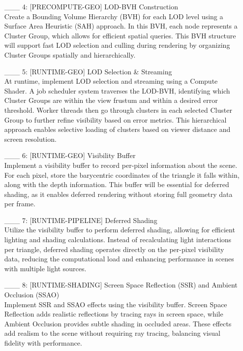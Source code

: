 \documentclass {article}
\begin{document}
\begin{enumerate}
     \item[\_\_\_ 4:]  [PRECOMPUTE-GEO] LOD-BVH Construction
     \\ Create a Bounding Volume Hierarchy (BVH) for each LOD level using a Surface Area Heuristic (SAH) approach. In this 
     BVH, each node represents a Cluster Group, which allows for efficient spatial queries. This BVH structure will support 
     fast LOD selection and culling during rendering by organizing Cluster Groups spatially and hierarchically.
 
     \item[\_\_\_ 5:]  [RUNTIME-GEO] LOD Selection \& Streaming
     \\ At runtime, implement LOD selection and streaming using a Compute Shader. A job scheduler system traverses the 
     LOD-BVH, identifying which Cluster Groups are within the view frustum and within a desired error threshold. Worker 
     threads then go through clusters in each selected Cluster Group to further refine visibility based on error metrics. 
     This hierarchical approach enables selective loading of clusters based on viewer distance and screen resolution.
 
     \item[\_\_\_ 6:]  [RUNTIME-GEO] Visibility Buffer
     \\ Implement a visibility buffer to record per-pixel information about the scene. For each pixel, store the barycentric 
     coordinates of the triangle it falls within, along with the depth information. This buffer will be essential for deferred 
     shading, as it enables deferred rendering without storing full geometry data per frame.
 
     \item[\_\_\_ 7:]  [RUNTIME-PIPELINE] Deferred Shading
     \\ Utilize the visibility buffer to perform deferred shading, allowing for efficient lighting and shading calculations. 
     Instead of recalculating light interactions per triangle, deferred shading operates directly on the per-pixel visibility 
     data, reducing the computational load and enhancing performance in scenes with multiple light sources.
 
     \item[\_\_\_ 8:]  [RUNTIME-SHADING] Screen Space Reflection (SSR) and Ambient Occlusion (SSAO)
     \\ Implement SSR and SSAO effects using the visibility buffer. Screen Space Reflection adds realistic reflections by tracing 
     rays in screen space, while Ambient Occlusion provides subtle shading in occluded areas. These effects add realism to the 
     scene without requiring ray tracing, balancing visual fidelity with performance.
 

\end{enumerate}
\end{document}
